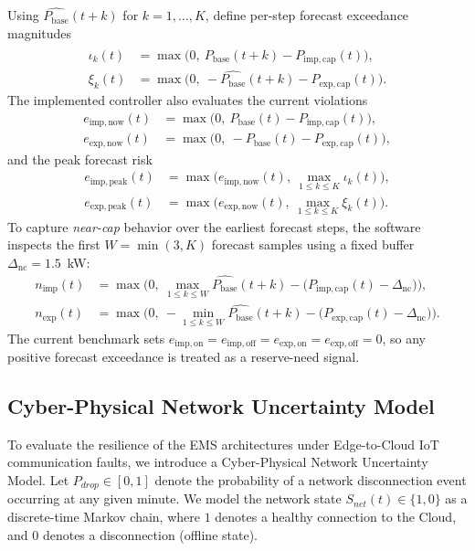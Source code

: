 \documentclass[preprint,12pt]{elsarticle}
\newcommand{\Pbase}{P_{\mathrm{base}}}
\begin{document}
Using $\widehat{\Pbase}(t+k)$ for $k=1,\dots,K$, define per-step forecast exceedance magnitudes
\begin{align}
\iota_k(t) &= \max\!\big(0,\ \widehat{\Pbase}(t+k)-P_{\mathrm{imp,cap}}(t)\big), \\
\xi_k(t) &= \max\!\big(0,\ -\widehat{\Pbase}(t+k)-P_{\mathrm{exp,cap}}(t)\big).
\end{align}
The implemented controller also evaluates the current violations
\begin{align}
e_{\mathrm{imp,now}}(t) &= \max\!\big(0,\ \Pbase(t)-P_{\mathrm{imp,cap}}(t)\big), \label{eq:eimp_now}\\
e_{\mathrm{exp,now}}(t) &= \max\!\big(0,\ -\Pbase(t)-P_{\mathrm{exp,cap}}(t)\big), \label{eq:eexp_now}
\end{align}
and the peak forecast risk
\begin{align}
e_{\mathrm{imp,peak}}(t) &= \max\!\Big(e_{\mathrm{imp,now}}(t),\ \max_{1\le k\le K}\iota_k(t)\Big), \label{eq:eimp_peak}\\
e_{\mathrm{exp,peak}}(t) &= \max\!\Big(e_{\mathrm{exp,now}}(t),\ \max_{1\le k\le K}\xi_k(t)\Big). \label{eq:eexp_peak}
\end{align}
To capture \emph{near-cap} behavior over the earliest forecast steps, the software inspects the first $W=\min(3,K)$ forecast samples using a fixed buffer $\Delta_{\mathrm{nc}}=1.5$~kW:
\begin{align}
n_{\mathrm{imp}}(t) &= \max\!\Big(0,\ \max_{1\le k\le W}\widehat{\Pbase}(t+k) - \big(P_{\mathrm{imp,cap}}(t)-\Delta_{\mathrm{nc}}\big)\Big), \label{eq:nimp}\\
n_{\mathrm{exp}}(t) &= \max\!\Big(0,\ -\min_{1\le k\le W}\widehat{\Pbase}(t+k) - \big(P_{\mathrm{exp,cap}}(t)-\Delta_{\mathrm{nc}}\big)\Big). \label{eq:nexp}
\end{align}
The current benchmark sets $e_{\mathrm{imp,on}}=e_{\mathrm{imp,off}}=e_{\mathrm{exp,on}}=e_{\mathrm{exp,off}}=0$, so any positive forecast exceedance is treated as a reserve-need signal.

\subsection{Cyber-Physical Network Uncertainty Model}
\label{subsec:network_model}

To evaluate the resilience of the EMS architectures under Edge-to-Cloud IoT communication faults, we introduce a Cyber-Physical Network Uncertainty Model. Let $P_{drop} \in [0, 1]$ denote the probability of a network disconnection event occurring at any given minute. We model the network state $S_{net}(t) \in \{1, 0\}$ as a discrete-time Markov chain, where $1$ denotes a healthy connection to the Cloud, and $0$ denotes a disconnection (offline state).
\end{document}
